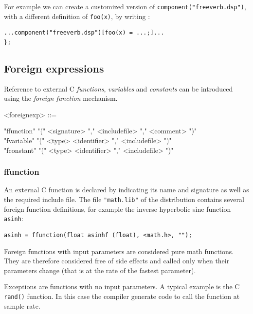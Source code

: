 \documentclass[a4paper,10pt]{book}
\begin{document}
For example we can create a customized version of \lstinline'component("freeverb.dsp")', with a different definition of \lstinline'foo(x)', by writing :
\begin{lstlisting}
...component("freeverb.dsp")[foo(x) = ...;]...
};
\end{lstlisting}


\subsection{Foreign expressions}

Reference to external C \textit{functions}, \textit{variables} and \textit{constants} can be introduced using the \textit{foreign function} mechanism.

\begin{grammar}
  <foreignexp> ::= 
  \begin{syntdiag}
    \begin{stack}
      "ffunction" "(" <signature> "," <includefile> "," <comment> ")" \\
      "fvariable" "(" <type> <identifier> "," <includefile> ")" \\
      "fconstant" "(" <type> <identifier> "," <includefile> ")" 
    \end{stack}
  \end{syntdiag}
\end{grammar}


\subsubsection{ffunction} 
An external C function is declared by indicating its name and signature as well as the required include file.
The file \lstinline'"math.lib"' of the \faust distribution contains several foreign function definitions, for example the inverse hyperbolic sine function \lstinline'asinh':

\begin{lstlisting}
asinh = ffunction(float asinhf (float), <math.h>, "");
\end{lstlisting}

Foreign functions with input parameters are considered pure math functions. They are therefore considered free of side effects and called only when their parameters change (that is at the rate of the fastest parameter). 

Exceptions are functions with no input parameters. A typical example is the C \lstinline'rand()' function. In this case the compiler generate code to call the function at sample rate.
\end{document}
